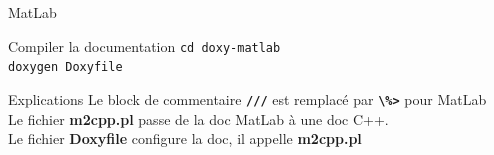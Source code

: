 \documentclass{beamer}
\begin{document}
\begin{frame}{MatLab}

\begin{block}{Compiler la documentation}
\textcolor{commandcolor}{\verb?cd doxy-matlab?}\\
\textcolor{commandcolor}{\verb?doxygen Doxyfile?}
\end{block}

\begin{exampleblock}{Explications}
Le block de commentaire \textcolor{dgreen}{\textbf{\verb?///?}} est remplacé par \textcolor{dgreen}{\textbf{\verb?\%>?}} pour MatLab\\
Le fichier \textbf{m2cpp.pl} passe de la doc MatLab à une doc C++.\\
Le fichier \textbf{Doxyfile} configure la doc, il appelle \textbf{m2cpp.pl}
\end{exampleblock}

\end{frame}
\end{document}
